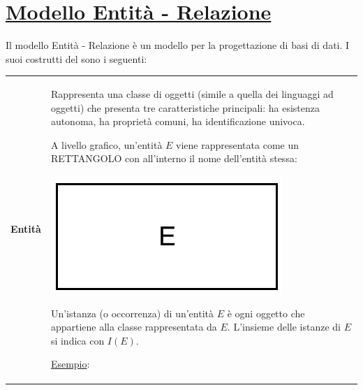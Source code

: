 \documentclass[a4paper, 10pt]{report}
\begin{document}
\section*{\underline{Modello Entità - Relazione}}

Il modello Entità - Relazione è un modello per la progettazione di basi di dati. I suoi costrutti del sono i seguenti:\\

\begin{longtable}{| p{} | p{} |} 
\textbf{Entità} & Rappresenta una classe di oggetti (simile a quella dei linguaggi ad oggetti) che presenta tre caratteristiche principali: ha esistenza autonoma, ha proprietà comuni, ha identificazione univoca.

A livello grafico, un'entità $E$ viene rappresentata come un RETTANGOLO con all'interno il nome dell'entità stessa:

\begin{center}
\includegraphics[scale=0.4]{img1.pdf}
\end{center}

Un'istanza (o occorrenza) di un'entità $E$ è ogni oggetto che appartiene alla classe rappresentata da $E$. L'insieme delle istanze di $E$ si indica con $I(E)$.

\underline{Esempio}:


\end{longtable}
\end{document}
